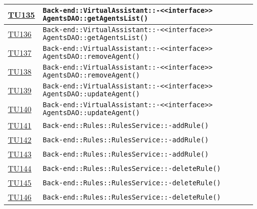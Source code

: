 \begin{longtable}{|>{\centering}m{1cm}|m{12cm}<{\centering}|}
\hyperlink{TU135}{TU135} & \texttt{Back-end::VirtualAssistant::-\linebreak <<interface>> AgentsDAO::getAgentsList()}\\ \hline

\hyperlink{TU136}{TU136} & \texttt{Back-end::VirtualAssistant::-\linebreak <<interface>> AgentsDAO::getAgentsList()}\\ \hline

\hyperlink{TU137}{TU137} & \texttt{Back-end::VirtualAssistant::-\linebreak <<interface>> AgentsDAO::removeAgent()}\\ \hline

\hyperlink{TU138}{TU138} & \texttt{Back-end::VirtualAssistant::-\linebreak <<interface>> AgentsDAO::removeAgent()}\\ \hline

\hyperlink{TU139}{TU139} & \texttt{Back-end::VirtualAssistant::-\linebreak <<interface>> AgentsDAO::updateAgent()}\\ \hline

\hyperlink{TU140}{TU140} & \texttt{Back-end::VirtualAssistant::-\linebreak <<interface>> AgentsDAO::updateAgent()}\\ \hline

\hyperlink{TU141}{TU141} & \texttt{Back-end::Rules::RulesService::-\linebreak addRule()}\\ \hline

\hyperlink{TU142}{TU142} & \texttt{Back-end::Rules::RulesService::-\linebreak addRule()}\\ \hline

\hyperlink{TU143}{TU143} & \texttt{Back-end::Rules::RulesService::-\linebreak addRule()}\\ \hline

\hyperlink{TU144}{TU144} & \texttt{Back-end::Rules::RulesService::-\linebreak deleteRule()}\\ \hline

\hyperlink{TU145}{TU145} & \texttt{Back-end::Rules::RulesService::-\linebreak deleteRule()}\\ \hline

\hyperlink{TU146}{TU146} & \texttt{Back-end::Rules::RulesService::-\linebreak deleteRule()}\\ \hline


\end{longtable}
